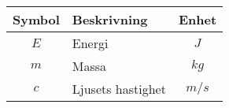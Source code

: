 \begin{raggedleft}
 \begin{tabular}{ c  l  c } 
 \textbf{Symbol} & \textbf{Beskrivning} & \textbf{Enhet} \\ [0.5ex] 
 \hline
 $E$ & Energi & $J$ \\ 
 \hline
   $m$ & Massa & $kg$ \\
 \hline
  $c$ & Ljusets hastighet & $m/s$ \\
 \hline
\end{tabular}
\end{raggedleft}